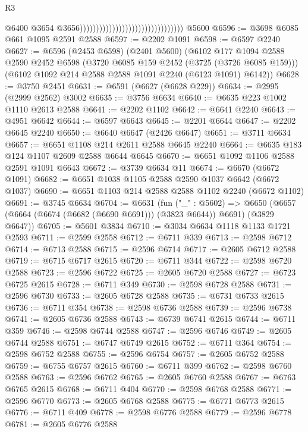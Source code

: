 \begin{lexlean}{R3}
\begin{coremodule}
                                                                    @6400
                                                                    @3654
                                                                    @3656))))))))))))))))))))))))))))))))
    @5600
@6596 := @3698 @6085 @661 @1095 @2591 @2588
@6597 := @2202 @1091
@6598 := @6597 @2240
@6627 := @6596
    (@2453 @6598)
    (@2401 @5600)
    (@6102
      @177
      @1094
      @2588
      @2590
      @2452
      @6598
      (@3720 @6085 @159 @2452 (@3725 (@3726 @6085 @159)))
      (@6102 @1092 @214 @2588 @2588 @1091 @2240 (@6123 @1091) @6142))
@6628 := @3750 @2451
@6631 := @6591 (@6627 (@6628 @229))
@6634 := @2995 (@2999 @2562) @3002
@6635 := @3756 @6634
@6640 := @6635 @223 @1002 @1110 @2613 @2588
@6641 := @2202 @1102
@6642 := @6641 @2240
@6643 := @4951 @6642
@6644 := @6597 @6643
@6645 := @2201 @6644
@6647 := @2202 @6645 @2240
@6650 := @6640 @6647 (@2426 @6647)
@6651 := @3711 @6634
@6657 := @6651 @1108 @214 @2611 @2588 @6645 @2240
@6664 := @6635 @183 @124 @1107 @2609 @2588 @6644 @6645
@6670 := @6651 @1092 @1106 @2588 @2591 @1091 @6643
@6672 := @3739 @6634 @11
@6674 := @6670 (@6672 @1091)
@6682 := @6651 @1038 @1105 @2588 @2590 @1037 @6642 (@6672 @1037)
@6690 := @6651 @1103 @214 @2588 @2588 @1102 @2240 (@6672 @1102)
@6691 := @3745 @6634
@6704 := @6631
    (fun ("_" : @5602) =>
    @6650 (@6657 (@6664 (@6674 (@6682 (@6690 @6691))) (@3823 @6644)) @6691) (@3829 @6647))
@6705 := @5601 @3834
@6710 := @3034 @6634 @1118 @1133 @1721 @2593
@6711 := @2599 @2558
@6712 := @6711 @339
@6713 := @2598 @6712
@6714 := @6713 @2588
@6715 := @2596 @6714
@6717 := @2605 @6712 @2588
@6719 := @6715 @6717 @2615
@6720 := @6711 @344
@6722 := @2598 @6720 @2588
@6723 := @2596 @6722
@6725 := @2605 @6720 @2588
@6727 := @6723 @6725 @2615
@6728 := @6711 @349
@6730 := @2598 @6728 @2588
@6731 := @2596 @6730
@6733 := @2605 @6728 @2588
@6735 := @6731 @6733 @2615
@6736 := @6711 @354
@6738 := @2598 @6736 @2588
@6739 := @2596 @6738
@6741 := @2605 @6736 @2588
@6743 := @6739 @6741 @2615
@6744 := @6711 @359
@6746 := @2598 @6744 @2588
@6747 := @2596 @6746
@6749 := @2605 @6744 @2588
@6751 := @6747 @6749 @2615
@6752 := @6711 @364
@6754 := @2598 @6752 @2588
@6755 := @2596 @6754
@6757 := @2605 @6752 @2588
@6759 := @6755 @6757 @2615
@6760 := @6711 @399
@6762 := @2598 @6760 @2588
@6763 := @2596 @6762
@6765 := @2605 @6760 @2588
@6767 := @6763 @6765 @2615
@6768 := @6711 @404
@6770 := @2598 @6768 @2588
@6771 := @2596 @6770
@6773 := @2605 @6768 @2588
@6775 := @6771 @6773 @2615
@6776 := @6711 @409
@6778 := @2598 @6776 @2588
@6779 := @2596 @6778
@6781 := @2605 @6776 @2588

\end{coremodule}
\end{lexlean}
